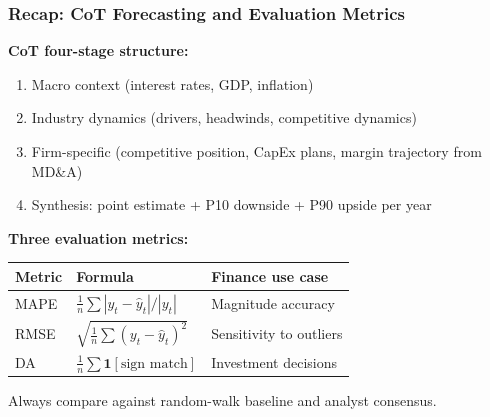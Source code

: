 \documentclass[9pt,t]{beamer}
\begin{document}
\begin{frame}
\frametitle{Recap: CoT Forecasting and Evaluation Metrics}

\textbf{CoT four-stage structure:}
\begin{enumerate}
  \item Macro context (interest rates, GDP, inflation)
  \item Industry dynamics (drivers, headwinds, competitive dynamics)
  \item Firm-specific (competitive position, CapEx plans, margin trajectory from MD\&A)
  \item Synthesis: point estimate + P10 downside + P90 upside per year
\end{enumerate}

\medskip
\textbf{Three evaluation metrics:}
\begin{center}
\begin{tabular}{lll}
\toprule
Metric & Formula & Finance use case \\
\midrule
MAPE & $\frac{1}{n}\sum|y_t-\hat{y}_t|/|y_t|$ & Magnitude accuracy \\
RMSE & $\sqrt{\frac{1}{n}\sum(y_t-\hat{y}_t)^2}$ & Sensitivity to outliers \\
DA & $\frac{1}{n}\sum\mathbf{1}[\text{sign match}]$ & Investment decisions \\
\bottomrule
\end{tabular}
\end{center}

Always compare against random-walk baseline and analyst consensus.
\end{frame}
\end{document}
